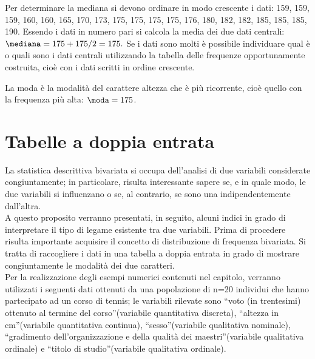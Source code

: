 \begin{esempio}
Per determinare la mediana si devono ordinare in modo crescente i dati:
159, 159, 159, 160, 160, 165, 170, 173, 175, 175, 175, 175, 176, 180, 182, 
182, 185, 185, 185, 190.
Essendo i dati in numero pari si calcola la media dei due dati centrali:
$\mediana = {175+175}/{2}=175.$
Se i dati sono molti è possibile individuare qual è o quali sono i dati 
centrali utilizzando la tabella delle
frequenze opportunamente costruita, cioè con i dati scritti in ordine 
crescente.

La moda è la modalità del carattere altezza che è più ricorrente, cioè 
quello con la frequenza più alta:
$\moda = 175$.
\end{esempio}



\section{Tabelle a doppia entrata}
\label{sec:c_stat_doppia_entrata}

La statistica descrittiva bivariata si occupa dell'analisi di due variabili 
considerate congiuntamente; in particolare, risulta interessante sapere se, 
e in quale modo, le due variabili si influenzano o se, al contrario, se 
sono una indipendentemente dall'altra.\\ 
A questo proposito verranno presentati, in seguito, alcuni indici in grado 
di interpretare il tipo di legame esistente tra due variabili. Prima di 
procedere risulta importante acquisire il concetto di distribuzione di 
frequenza bivariata. 
Si tratta di raccogliere i dati in una tabella a doppia entrata in grado di 
mostrare congiuntamente le modalità dei due caratteri.\\
Per la realizzazione degli esempi numerici contenuti nel capitolo, verranno 
utilizzati i seguenti dati ottenuti da una popolazione di n=20 individui 
che hanno partecipato ad un corso di tennis; le variabili rilevate sono 
\textquotedblleft voto (in trentesimi) ottenuto al termine del 
corso\textquotedblright (variabile quantitativa discreta), 
\textquotedblleft altezza in cm\textquotedblright (variabile quantitativa 
continua), \textquotedblleft sesso\textquotedblright (variabile qualitativa 
nominale), \textquotedblleft gradimento dell'organizzazione e della qualità 
dei maestri\textquotedblright (variabile qualitativa ordinale) e 
\textquotedblleft titolo di studio\textquotedblright (variabile qualitativa 
ordinale).

